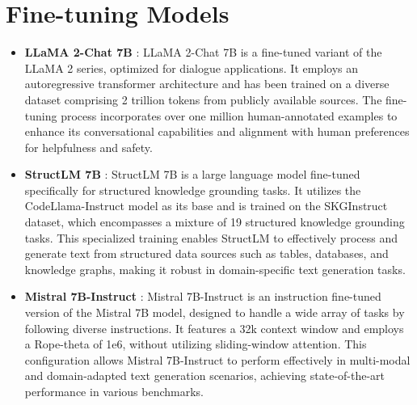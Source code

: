 \section{Fine-tuning Models}
\label{sec:fine-tuning-models}

\begin{itemize}
    \item \textbf{LLaMA 2-Chat 7B} \cite{touvron2023llama}: LLaMA 2-Chat 7B is a fine-tuned variant of the LLaMA 2 series, optimized for dialogue applications. It employs an autoregressive transformer architecture and has been trained on a diverse dataset comprising 2 trillion tokens from publicly available sources. The fine-tuning process incorporates over one million human-annotated examples to enhance its conversational capabilities and alignment with human preferences for helpfulness and safety.

    \item \textbf{StructLM 7B} \cite{zhuang2024structlm}: StructLM 7B is a large language model fine-tuned specifically for structured knowledge grounding tasks. It utilizes the CodeLlama-Instruct model as its base and is trained on the SKGInstruct dataset, which encompasses a mixture of 19 structured knowledge grounding tasks. This specialized training enables StructLM to effectively process and generate text from structured data sources such as tables, databases, and knowledge graphs, making it robust in domain-specific text generation tasks.

    \item \textbf{Mistral 7B-Instruct} \cite{jiang2023mistral}: Mistral 7B-Instruct is an instruction fine-tuned version of the Mistral 7B model, designed to handle a wide array of tasks by following diverse instructions. It features a 32k context window and employs a Rope-theta of 1e6, without utilizing sliding-window attention. This configuration allows Mistral 7B-Instruct to perform effectively in multi-modal and domain-adapted text generation scenarios, achieving state-of-the-art performance in various benchmarks.
\end{itemize}

